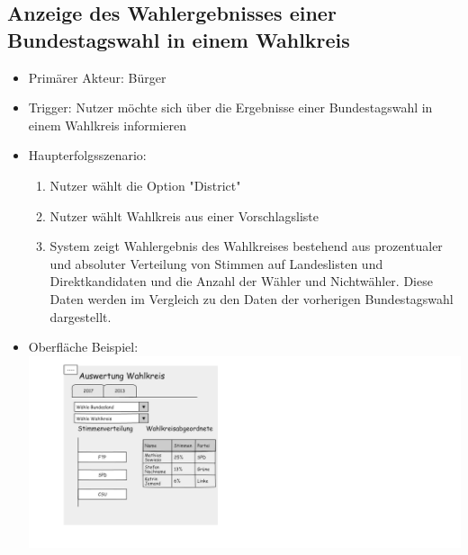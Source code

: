 \documentclass[a4paper]{scrreprt}
\begin{document}
\subsection{Anzeige des Wahlergebnisses einer Bundestagswahl in einem Wahlkreis}
\begin{itemize}
\item Primärer Akteur: Bürger
\item Trigger: Nutzer möchte sich über die Ergebnisse einer Bundestagswahl in einem Wahlkreis informieren
\item Haupterfolgsszenario:
\begin{enumerate}
\item Nutzer wählt die Option "District"
\item Nutzer wählt Wahlkreis aus einer Vorschlagsliste
\item System zeigt Wahlergebnis des Wahlkreises bestehend aus prozentualer und absoluter Verteilung von Stimmen auf Landeslisten und Direktkandidaten und die Anzahl der Wähler und Nichtwähler. Diese Daten werden im Vergleich zu den Daten der vorherigen Bundestagswahl dargestellt.
\end{enumerate}
\item Oberfläche Beispiel: \\
\includegraphics[width=\textwidth]{images/wahlkreis.png}
\end{itemize}
\end{document}
